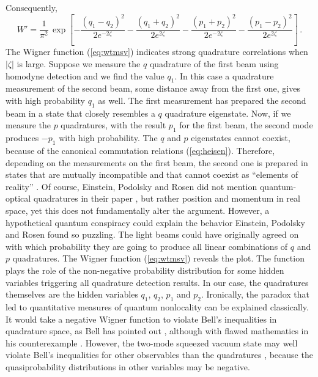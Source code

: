 \documentclass[12pt,amsmath,amssymb]{article}
\numberwithin{equation}{section}
\begin{document}
Consequently,
\begin{equation}
\label{eq:wtmsv}
W' =
\frac{1}{\pi^2}\, \exp\left[
-\frac{(q_1-q_2)^2}{2e^{-2\zeta}}
-\frac{(q_1+q_2)^2}{2e^{2\zeta}}
-\frac{(p_1+p_2)^2}{2e^{-2\zeta}}
-\frac{(p_1-p_2)^2}{2e^{2\zeta}}
\right] \,.
\end{equation}
The Wigner function (\ref{eq:wtmsv}) indicates strong
quadrature correlations when $|\zeta|$ is large.
Suppose we measure the $q$ quadrature
of the first beam using homodyne detection \cite{Leonhardt}
and we find the value $q_1$. In this case a quadrature
measurement of the second beam, some distance away from
the first one, gives with high probability $q_1$ as well.
The first measurement has prepared the second
beam in a state that closely resembles a $q$ quadrature eigenstate.
Now, if we measure the $p$ quadratures, with the result $p_1$
for the first beam, the second mode produces $-p_1$ with
high probability.
The $q$ and $p$ eigenstates cannot coexist, because of the
canonical commutation relations (\ref{eq:heisen}).
Therefore, depending on the measurements
on the first beam, the second one is prepared in states
that are mutually incompatible
and that cannot coexist as ``elements of reality'' \cite{EPR}.
Of course, Einstein, Podolsky and Rosen
did not mention quantum-optical quadratures in their paper \cite{EPR},
but rather position and momentum in real space,
yet this does not fundamentally alter the argument.
However, a hypothetical quantum conspiracy could
explain the behavior
Einstein, Podolsky and Rosen found so puzzling.
The light beams could have originally agreed on with which
probability they are going to produce all linear combinations of
$q$ and $p$ quadratures. The Wigner function (\ref{eq:wtmsv})
reveals the plot. The function plays the role of the non-negative
probability distribution for some hidden variables triggering
all quadrature detection results. In our case, the quadratures
themselves are the hidden variables
$q_1$, $q_2$, $p_1$ and $p_2$.
Ironically, the paradox that led to quantitative measures of
quantum nonlocality can be explained classically.
It would take a negative Wigner function \cite{LeoVac}
to violate Bell's inequalities in quadrature space,
as Bell has pointed out \cite{BellEPW}, although with
flawed mathematics in his counterexample \cite{Johansen}.
However, the two-mode squeezed vacuum state
may well violate Bell's inequalities for other observables
than the quadratures \cite{Banaszek},
because the quasiprobability distributions
in other variables \cite{LeoDiscrete0,LeoDiscrete,Vacarro}
may be negative.
\end{document}
